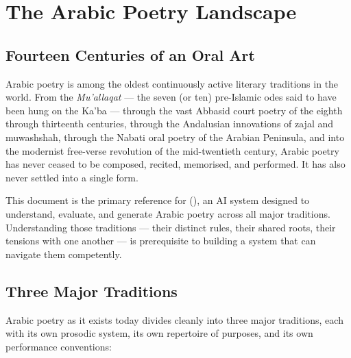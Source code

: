 \chapter{The Arabic Poetry Landscape}
\label{ch:landscape}

\section{Fourteen Centuries of an Oral Art}
\label{sec:landscape_history}

Arabic poetry is among the oldest continuously active literary traditions in the world. From the \textit{Mu'allaqat} — the seven (or ten) pre-Islamic odes said to have been hung on the Ka'ba — through the vast Abbasid court poetry of the eighth through thirteenth centuries, through the Andalusian innovations of zajal and muwashshah, through the Nabati oral poetry of the Arabian Peninsula, and into the modernist free-verse revolution of the mid-twentieth century, Arabic poetry has never ceased to be composed, recited, memorised, and performed. It has also never settled into a single form.

This document is the primary reference for \poeteng{} (), an AI system designed to understand, evaluate, and generate Arabic poetry across all major traditions. Understanding those traditions — their distinct rules, their shared roots, their tensions with one another — is prerequisite to building a system that can navigate them competently.

\section{Three Major Traditions}
\label{sec:landscape_traditions}

Arabic poetry as it exists today divides cleanly into three major traditions, each with its own prosodic system, its own repertoire of purposes, and its own performance conventions:

